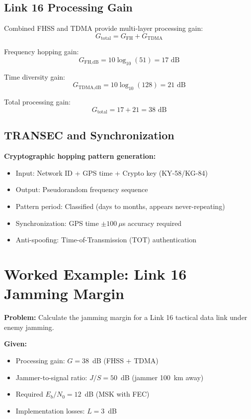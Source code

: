 \subsection{Link 16 Processing Gain}

Combined FHSS and TDMA provide multi-layer processing gain:
\begin{equation}
G_{\text{total}} = G_{\text{FH}} + G_{\text{TDMA}}
\end{equation}

Frequency hopping gain:
\begin{equation}
G_{\text{FH,dB}} = 10 \log_{10}(51) = 17 \text{ dB}
\end{equation}

Time diversity gain:
\begin{equation}
G_{\text{TDMA,dB}} = 10 \log_{10}(128) = 21 \text{ dB}
\end{equation}

Total processing gain:
\begin{equation}
G_{\text{total}} = 17 + 21 = 38 \text{ dB}
\end{equation}

\subsection{TRANSEC and Synchronization}

\textbf{Cryptographic hopping pattern generation:}
\begin{itemize}
\item Input: Network ID + GPS time + Crypto key (KY-58/KG-84)
\item Output: Pseudorandom frequency sequence
\item Pattern period: Classified (days to months, appears never-repeating)
\item Synchronization: GPS time $\pm 100~\mu$s accuracy required
\item Anti-spoofing: Time-of-Transmission (TOT) authentication
\end{itemize}

\section{Worked Example: Link 16 Jamming Margin}

\textbf{Problem:} Calculate the jamming margin for a Link 16 tactical data link under enemy jamming.

\textbf{Given:}
\begin{itemize}
\item Processing gain: $G = 38$~dB (FHSS + TDMA)
\item Jammer-to-signal ratio: $J/S = 50$~dB (jammer 100~km away)
\item Required $E_b/N_0 = 12$~dB (MSK with FEC)
\item Implementation losses: $L = 3$~dB
\end{itemize}

